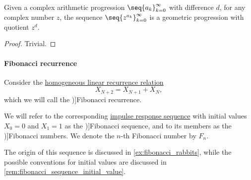 \begin{proposition}\label{thm:arithmetic_to_geometric_progression}
  Given a complex arithmetic progression \( \seq{ a_k }_{k=0}^\infty \) with difference \( d \), for any complex number \( z \), the sequence \( \seq{ z^{a_k} }_{k=0}^\infty \) is a geometric progression with quotient \( z^d \).
\end{proposition}
\begin{proof}
  Trivial.
\end{proof}

\paragraph{Fibonacci recurrence}

\begin{definition}\label{def:fibonacci_numbers}
  Consider the \hyperref[def:homogeneous_linear_recurrence]{homogeneous linear recurrence relation}
  \begin{equation}\label{eq:def:fibonacci_numbers}
    X_{N+2} = X_{N+1} + X_N,
  \end{equation}
  which we will call the \term[en=Fibonacci recurrence (\cite[8]{Wilf1994GeneratingFunctionsOnline})]{Fibonacci recurrence}.

  We will refer to the corresponding \hyperref[def:recurrence_relation_space]{impulse response sequence} with initial values \( X_0 = 0 \) and \( X_1 = 1 \) as the \term[ru=последовательность Фибоначчи (\cite[exerc. 7.15]{ГашковЧубариков2005СложностьВычисления})]{Fibonacci sequence}, and to its members as the \term[ru=числа Фибоначчи (\cite[\S 5.7.3]{Новиков2013ДискретнаяМатематика})]{Fibonacci numbers}. We denote the \( n \)-th Fibonacci number by \( F_n \).
\end{definition}
\begin{comments}
  \item The origin of this sequence is discussed in \cref{ex:fibonacci_rabbits}, while the possible conventions for initial values are discussed in \cref{rem:fibonacci_sequence_initial_value}.
\end{comments}

